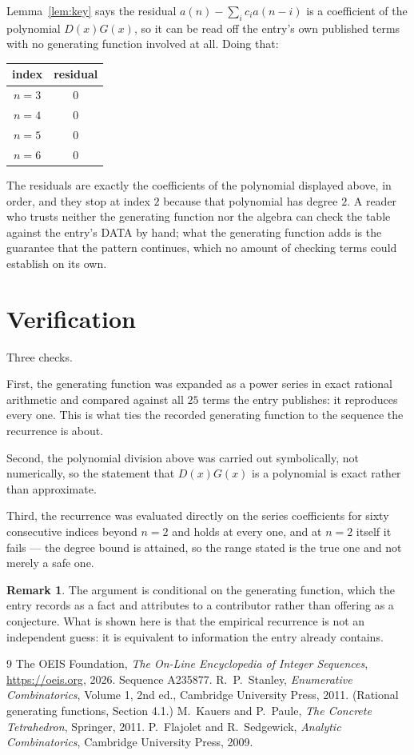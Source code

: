 \documentclass[11pt,a4paper]{article}
\theoremstyle{plain}
\theoremstyle{definition}
\newtheorem{remark}[theorem]{Remark}
\begin{document}
Lemma~\ref{lem:key} says the residual $a(n)-\sum_ic_ia(n-i)$ is a coefficient of the
polynomial $D(x)G(x)$, so it can be read off the entry's own published terms with no
generating function involved at all. Doing that:
\begin{center}
\begin{tabular}{cc}
index & residual \\ \hline
$n=3$ & $0$ \\
$n=4$ & $0$ \\
$n=5$ & $0$ \\
$n=6$ & $0$
\end{tabular}
\end{center}
The residuals are exactly the coefficients of the polynomial displayed above, in order, and
they stop at index $2$ because that polynomial has degree $2$. A reader who trusts
neither the generating function nor the algebra can check the table against the entry's DATA
by hand; what the generating function adds is the guarantee that the pattern continues, which
no amount of checking terms could establish on its own.

\section{Verification}

Three checks.

First, the generating function was expanded as a power series in exact rational arithmetic and
compared against all $25$ terms the entry publishes: it reproduces every one. This is
what ties the recorded generating function to the sequence the recurrence is about.

Second, the polynomial division above was carried out symbolically, not numerically, so the
statement that $D(x)G(x)$ is a polynomial is exact rather than approximate.

Third, the recurrence was evaluated directly on the series coefficients for sixty consecutive
indices beyond $n=2$ and holds at every one, and at $n=2$ itself it fails --- the
degree bound is attained, so the range stated is the true one and not merely a safe one.

\begin{remark}
The argument is conditional on the generating function, which the entry records as a fact and
attributes to a contributor rather than offering as a conjecture. What is shown here is that
the empirical recurrence is not an independent guess: it is equivalent to information the
entry already contains.
\end{remark}

\begin{thebibliography}{9}
 The OEIS Foundation, \emph{The On-Line Encyclopedia of Integer
Sequences}, \url{https://oeis.org}, 2026. Sequence A235877.
 R.~P.~Stanley, \emph{Enumerative Combinatorics}, Volume 1, 2nd ed.,
Cambridge University Press, 2011. (Rational generating functions, Section 4.1.)
 M.~Kauers and P.~Paule, \emph{The Concrete Tetrahedron}, Springer, 2011.
 P.~Flajolet and R.~Sedgewick, \emph{Analytic Combinatorics}, Cambridge
University Press, 2009.
\end{thebibliography}
\end{document}
